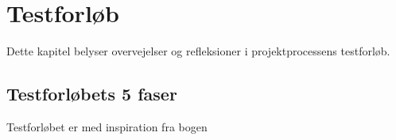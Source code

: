 \chapter{Testforløb}

Dette kapitel belyser overvejelser og refleksioner i projektprocessens testforløb.

	\section{Testforløbets 5 faser}
	Testforløbet er med inspiration fra bogen 
